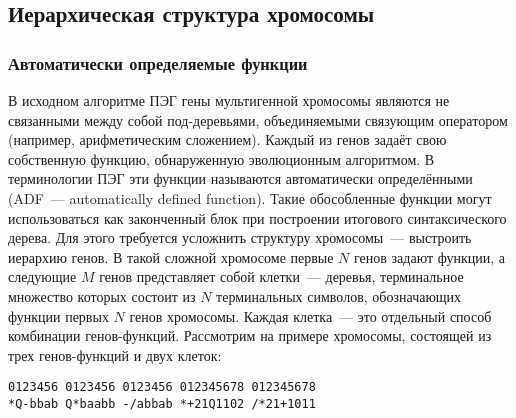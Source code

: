\subsection{Иерархическая структура хромосомы}

\subsubsection{Автоматически определяемые функции}

В исходном алгоритме ПЭГ гены мультигенной хромосомы являются не связанными между собой под-деревьями, объединяемыми связующим оператором (например, арифметическим сложением). Каждый из генов задаёт свою собственную функцию, обнаруженную эволюционным алгоритмом. В терминологии ПЭГ эти функции называются автоматически определёнными (ADF~--- automatically defined function). Такие обособленные функции могут использоваться как законченный блок при построении итогового синтаксического дерева. Для этого требуется усложнить структуру хромосомы~--- выстроить иерархию генов. В такой сложной хромосоме первые $N$ генов задают функции, а следующие $M$ генов представляет собой клетки~--- деревья, терминальное множество которых состоит из $N$ терминальных символов, обозначающих функции первых $N$ генов хромосомы. Каждая клетка~--- это отдельный способ комбинации генов-функций.
Рассмотрим на примере хромосомы, состоящей из трех генов-функций и двух клеток:

\begin{samepage}
\begin{verbatim}
0123456 0123456 0123456 012345678 012345678
*Q-bbab Q*baabb -/abbab *+21Q1102 /*21+1011
\end{verbatim}
\end{samepage}


